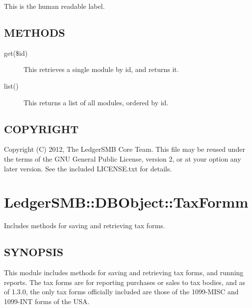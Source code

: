 \begin{description}
\begin{description}
\begin{description}
\begin{description}
\begin{description}
\begin{description}
\begin{description}
\begin{description}
\begin{description}
\begin{description}
\begin{description}
This is the human readable label.

\end{description}
\subsection*{METHODS\label{LedgerSMB::DBObject::App_Module_-_-_Application_Module_Lists_for_LedgerSMB_METHODS}}
\begin{description}

\item[{get(\$id)}] \mbox{}

This retrieves a single module by id, and returns it.


\item[{list()}] \mbox{}

This returns a list of all modules, ordered by id.

\end{description}
\subsection*{COPYRIGHT\label{LedgerSMB::DBObject::App_Module_-_-_Application_Module_Lists_for_LedgerSMB_COPYRIGHT}}


Copyright (C) 2012, The LedgerSMB Core Team.  This file may be reused under the terms of
the GNU General Public License, version 2, or at your option any later version.  See
the included LICENSE.txt for details.

\section{LedgerSMB::DBObject::TaxFormm\label{LedgerSMB::DBObject::TaxFormm}}


Includes methods for saving and retrieving tax forms.

\subsection*{SYNOPSIS\label{LedgerSMB::DBObject::TaxFormm_SYNOPSIS}}


This module includes methods for saving and retrieving tax forms, and running
reports.  The tax forms are for reporting purchases or sales to tax bodies, and
as of 1.3.0, the only tax forms officially included are those of the 1099-MISC 
and 1099-INT forms of the USA.




\end{description}
\end{description}
\end{description}
\end{description}
\end{description}
\end{description}
\end{description}
\end{description}
\end{description}
\end{description}
